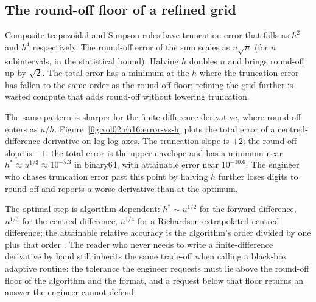 \subsection{The round-off floor of a refined grid}

Composite trapezoidal and Simpson rules have truncation error that
falls as $h^{2}$ and $h^{4}$ respectively. The round-off error of
the sum scales as $u \sqrt{n}$ (for $n$ subintervals, in the
statistical bound). Halving $h$ doubles $n$ and brings round-off up
by $\sqrt{2}$. The total error has a minimum at the $h$ where the
truncation error has fallen to the same order as the round-off
floor; refining the grid further is wasted compute that adds
round-off without lowering truncation.

The same pattern is sharper for the finite-difference derivative,
where round-off enters as $u/h$. Figure~\ref{fig:vol02:ch16:error-vs-h}
plots the total error of a centred-difference derivative on log-log
axes. The truncation slope is $+2$; the round-off slope is $-1$; the
total error is the upper envelope and has a minimum near
$h^{*} \approx u^{1/3} \approx 10^{-5.3}$ in binary64, with attainable
error near $10^{-10.6}$. The engineer who chases truncation error
past this point by halving $h$ further loses digits to round-off and
reports a worse derivative than at the optimum.



The optimal step is algorithm-dependent: $h^{*} \sim u^{1/2}$ for
the forward difference, $u^{1/3}$ for the centred difference, $u^{1/4}$
for a Richardson-extrapolated centred difference; the attainable
relative accuracy is the algorithm's order divided by one plus that
order \cite[\S 5.7]{text:higham-numerical}. The reader who never
needs to write a finite-difference derivative by hand still inherits
the same trade-off when calling a black-box adaptive routine: the
tolerance the engineer requests must lie above the round-off floor
of the algorithm and the format, and a request below that floor
returns an answer the engineer cannot defend.


